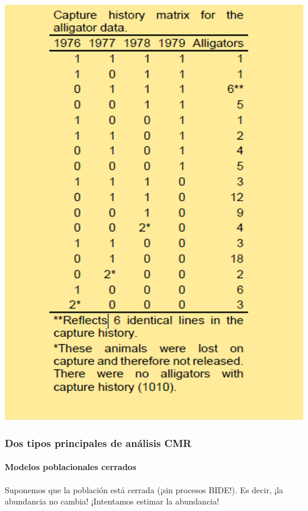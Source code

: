 \documentclass[
]{article}
\begin{document}
\includegraphics{figures/caphist1.png}

\hypertarget{dos-tipos-principales-de-anuxe1lisis-cmr}{%
\subsubsection{Dos tipos principales de análisis
CMR}\label{dos-tipos-principales-de-anuxe1lisis-cmr}}

\hypertarget{modelos-poblacionales-cerrados}{%
\paragraph{Modelos poblacionales
cerrados}\label{modelos-poblacionales-cerrados}}

Suponemos que la población está cerrada (¡sin procesos BIDE!). Es decir,
¡la abundancia no cambia! ¡Intentamos estimar la abundancia!
\end{document}
